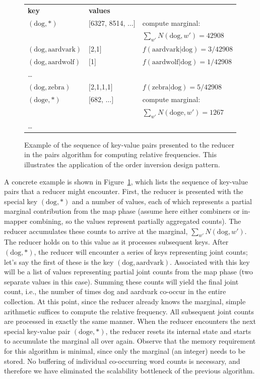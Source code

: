 \begin{figure}[t]
\begin{tabular}{lll}
\textbf{key} & \textbf{values} &  \\
$(\textrm{dog}, \ast)$        & $[$6327, 8514, $\ldots$$]$ & compute marginal: \\
 & & $\sum_{w'}{N(\textrm{dog},w')} = 42908$\\
$(\textrm{dog}, \textrm{aardvark})$ & $[$2,1$]$    & $f(\textrm{aardvark}|\textrm{dog}) = 3/42908$ \\
$(\textrm{dog}, \textrm{aardwolf})$ & $[$1$]$      & $f(\textrm{aardwolf}|\textrm{dog}) = 1/42908$ \\
\ldots            &      & \\
$(\textrm{dog}, \textrm{zebra})$    & $[$2,1,1,1$]$    & $f(\textrm{zebra}|\textrm{dog}) = 5/42908$ \\
$(\textrm{doge}, \ast)$       & $[$682, $\ldots$$]$  & compute marginal: \\
&& $\sum_{w'}{N(\textrm{doge},w')} = 1267$\\
\ldots            &      & \\
\end{tabular}
\caption{Example of the sequence of key-value pairs presented to the
  reducer in the pairs algorithm for computing relative frequencies.
  This illustrates the application of the order inversion design
  pattern.}
\label{figure:chapter3:cond-prob-reducer}
\end{figure}

A concrete example is shown in
Figure~\ref{figure:chapter3:cond-prob-reducer}, which lists the
sequence of key-value pairs that a reducer might encounter.  First,
the reducer is presented with the special key $(\textrm{dog}, \ast)$
and a number of values, each of which represents a partial marginal
contribution from the map phase (assume here either combiners or
in-mapper combining, so the values represent partially aggregated
counts).  The reducer accumulates these counts to arrive at the
marginal, $\sum_{w'}{N(\textrm{dog},w')}$.  The reducer holds on to
this value as it processes subsequent keys.  After $(\textrm{dog},
\ast)$, the reducer will encounter a series of keys representing joint
counts; let's say the first of these is the key $(\textrm{dog},
\textrm{aardvark})$.  Associated with this key will be a list of
values representing partial joint counts from the map phase (two
separate values in this case).  Summing these counts will yield the
final joint count, i.e., the number of times dog and aardvark co-occur
in the entire collection.  At this point, since the reducer already
knows the marginal, simple arithmetic suffices to compute the relative
frequency.  All subsequent joint counts are processed in exactly the
same manner.  When the reducer encounters the next special key-value
pair $(\textrm{doge}, \ast)$, the reducer resets its internal state
and starts to accumulate the marginal all over again.  Observe that
the memory requirement for this algorithm is minimal, since only the
marginal (an integer) needs to be stored.  No buffering of individual
co-occurring word counts is necessary, and therefore we have
eliminated the scalability bottleneck of the previous algorithm.

